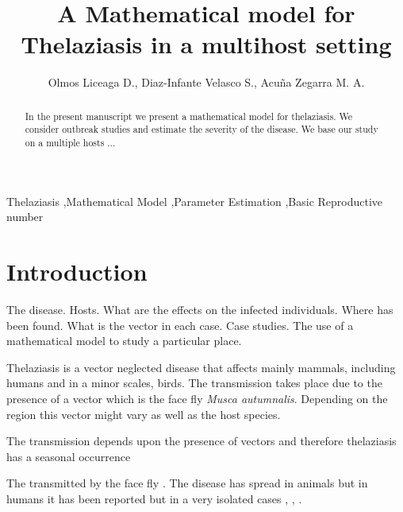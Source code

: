\documentclass[preprint,12pt]{elsarticle}
\begin{document}
\begin{frontmatter}

\title{A Mathematical model for Thelaziasis in a multihost setting}

\author{Olmos Liceaga D., Diaz-Infante Velasco S., Acu\~na Zegarra M. A.}
\address{Universidad de Sonora}
\begin{abstract}
In the present manuscript we present a mathematical model for thelaziasis. We consider outbreak studies and estimate the severity of the disease. We base our study on a multiple hosts ...
\end{abstract}

\begin{keyword}
Thelaziasis \sep Mathematical Model \sep Parameter Estimation \sep Basic Reproductive number


\end{keyword}

\end{frontmatter}

\linenumbers

\section{Introduction}
\label{Section:Intro}

\noindent The disease. Hosts. What are the effects on the infected individuals. Where has been found. What is the vector in each case. Case studies. The use of a mathematical model to study a particular place.

\noindent Thelaziasis is a vector neglected disease that affects mainly mammals, including humans and in a minor scales, birds. The transmission takes place due to the presence of a vector which is the face fly \textit{Musca autumnalis}. Depending on the region this vector might vary as well as the host species.

\noindent The transmission depends upon the presence of vectors and therefore thelaziasis has a seasonal occurrence \cite{Asrat:2016}

\noindent The transmitted by the face fly \cite{Otranto:2003}. The disease has spread in animals but in humans it has been reported but in a very isolated cases \cite{Wang:2014}, \cite{Otranto:2008}, \cite{shen:2006}.\\
\end{document}
